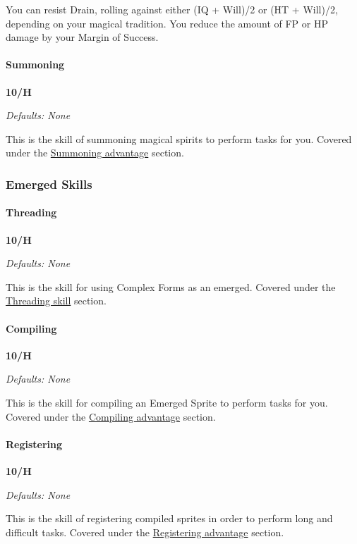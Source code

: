 \begin{multicols}{3}
	You can resist Drain, rolling against either (IQ + Will)/2 or (HT + Will)/2, depending on your magical tradition. You reduce the amount of FP or HP damage by your Margin of Success.
	
	\paragraph{Summoning}
	\begin{flushright}
		\textbf{10/H}
	\end{flushright}
	\textcolor{NavyBlue}{\textit{Defaults: None}}
	
	This is the skill of summoning magical spirits to perform tasks for you. Covered under the \hyperref[summoning]{Summoning advantage} section.
	
	\subsubsection*{Emerged Skills}
	
	\paragraph{Threading}
	\begin{flushright}
		\textbf{10/H}
	\end{flushright}
	\textcolor{NavyBlue}{\textit{Defaults: None}}
	
	This is the skill for using Complex Forms as an emerged. Covered under the \hyperref[threading]{Threading skill} section.
	
	\paragraph{Compiling}
	\begin{flushright}
		\textbf{10/H}
	\end{flushright}
	\textcolor{NavyBlue}{\textit{Defaults: None}}
	
	This is the skill for compiling an Emerged Sprite to perform tasks for you. Covered under the \hyperref[compiling]{Compiling advantage} section.
	
	\paragraph{Registering}
	\begin{flushright}
		\textbf{10/H}
	\end{flushright}
	\textcolor{NavyBlue}{\textit{Defaults: None}}
	
	This is the skill of registering compiled sprites in order to perform long and difficult tasks. Covered under the \hyperref[registering]{Registering advantage} section.
	
\end{multicols}

